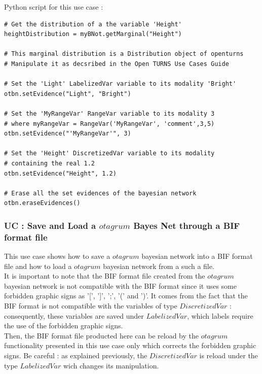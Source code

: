 \espace 

Python  script for this use case :

\begin{lstlisting}
# Get the distribution of a the variable 'Height'
heightDistribution = myBNot.getMarginal("Height")

# This marginal distribution is a Distribution object of openturns
# Manipulate it as decsribed in the Open TURNS Use Cases Guide

# Set the 'Light' LabelizedVar variable to its modality 'Bright'
otbn.setEvidence("Light", "Bright")

# Set the 'MyRangeVar' RangeVar variable to its modality 3
# where myRangeVar = RangeVar('MyRangeVar', 'comment',3,5)
otbn.setEvidence("'MyRangeVar'", 3)

# Set the 'Height' DiscretizedVar variable to its modality 
# containing the real 1.2
otbn.setEvidence("Height", 1.2)

# Erase all the set evidences of the bayesian network
otbn.eraseEvidences()
\end{lstlisting}


\newpage \subsubsection{UC : Save and Load a  $otagrum$  Bayes Net through a BIF  format file}


This use case shows how to save a $otagrum$  bayesian network into a BIF format file and how to load a $otagrum$ bayesian network from a such a file. \\

It is important to note that the BIF format file created from the $otagrum$  bayesian network is not compatible with the BIF format since it uses some forbidden graphic signs as '[', ']', ';', '(' and ')'. It comes from the fact that the BIF format is not compatible with the  variables of type $DiscretizedVar$ : consequently, these variables are  saved under $LabelizedVar$, which labels require the use of the forbidden graphic signs.\\
Then, the BIF format file producted here can  be reload by the $otagrum$ functionality presented in this use case only which corrects the forbidden graphic signs. Be careful : as explained previously, the $DiscretizedVar$ is reload under the type $LabelizedVar$ wich changes its manipulation.\\

